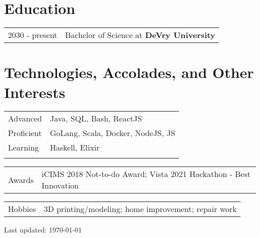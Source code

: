 \documentclass[a4paper,11pt]{article}
\begin{document}
\section{Education}
\begin{tabularx}{\linewidth}{@{}l X@{}}	
2030 - present & Bachelor of Science at \textbf{DeVry University} \hfill \normalsize \\

\end{tabularx}

\section{Technologies, Accolades, and Other Interests}
\begin{tabularx}{\linewidth}{@{}l X@{}}
Advanced &  \normalsize{Java, SQL, Bash, ReactJS}\\
Proficient  &  \normalsize{GoLang, Scala, Docker, NodeJS, JS}\\
Learning & \normalsize{Haskell, Elixir}\\
\newline
\end{tabularx}
\begin{tabularx}{\linewidth}{@{}l X@{}}
Awards &  \normalsize{iCIMS 2018 Not-to-do Award; Vista 2021 Hackathon - Best Innovation}\\ 
\end{tabularx}
\begin{tabularx}{\linewidth}{@{}l X@{}}
Hobbies &  \normalsize{3D printing/modeling; home improvement; repair work}\\ 
\end{tabularx}

\vfill
{\footnotesize Last updated: \today}
\end{document}
